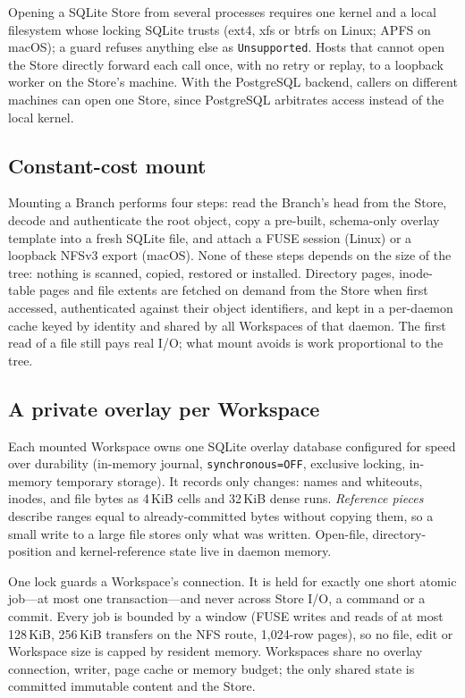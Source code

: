 \documentclass[letterpaper,twocolumn,10pt]{article}
\newcommand{\ws}{Workspace}
\begin{document}
Opening a SQLite Store from several processes requires one kernel and a
local filesystem whose locking SQLite trusts (ext4, xfs or btrfs on Linux;
APFS on macOS); a guard refuses anything else as \texttt{Unsupported}. Hosts
that cannot open the Store directly forward each call once, with no retry
or replay, to a loopback worker on the Store's machine. With the PostgreSQL
backend, callers on different machines can open one Store, since
PostgreSQL arbitrates access instead of the local kernel.

\subsection{Constant-cost mount}
\label{sec:mount}

Mounting a Branch performs four steps: read the Branch's head from the
Store, decode and authenticate the root object, copy a pre-built,
schema-only overlay template into a fresh SQLite file, and attach a FUSE
session (Linux) or a loopback NFSv3 export (macOS). None of these steps
depends on the size of the tree: nothing is scanned, copied, restored or
installed. Directory pages, inode-table pages and file extents are fetched
on demand from the Store when first accessed, authenticated against their
object identifiers, and kept in a per-daemon cache keyed by identity and
shared by all \ws{}s of that daemon. The first read of a file still pays
real I/O; what mount avoids is work proportional to the tree.

\subsection{A private overlay per \ws{}}
\label{sec:overlay}

Each mounted \ws{} owns one SQLite overlay database configured for speed
over durability (in-memory journal, \texttt{synchronous=OFF}, exclusive
locking, in-memory temporary storage). It records only changes: names and
whiteouts, inodes, and file bytes as 4\,KiB cells and 32\,KiB dense runs.
\emph{Reference pieces} describe ranges equal to already-committed bytes
without copying them, so a small write to a large file stores only what was
written. Open-file, directory-position and kernel-reference state live in
daemon memory.

One lock guards a \ws{}'s connection. It is held for exactly one short
atomic job---at most one transaction---and never across Store I/O, a command
or a commit. Every job is bounded by a window (FUSE writes and reads of at
most 128\,KiB, 256\,KiB transfers on the NFS route, 1,024-row pages), so no file, edit or \ws{} size is capped by
resident memory. Workspaces share no overlay connection, writer, page cache
or memory budget; the only shared state is committed immutable content and
the Store.
\end{document}
